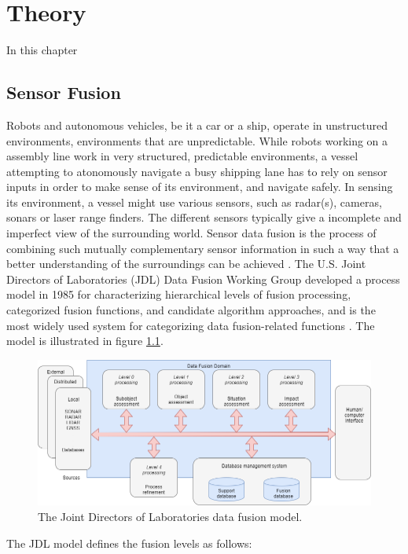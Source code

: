 
\chapter{Theory}
In this chapter 
\section{Sensor Fusion}
\label{section:fusion}
Robots and autonomous vehicles, be it a car or a ship, operate in unstructured environments, environments that are unpredictable. While robots working on a assembly line work in very structured, predictable environments, a vessel attempting to atonomously navigate a busy shipping lane has to rely on sensor inputs in order to make sense of its environment, and navigate safely. In sensing its environment, a vessel might use various sensors, such as radar(s), cameras, sonars or laser range finders. The different sensors typically give a incomplete and imperfect view of the surrounding world. Sensor data fusion is the process of combining such mutually complementary sensor information in such a way that a better understanding of the surroundings can be achieved \cite{sensorFusion1}.
The U.S. Joint Directors of Laboratories (JDL) Data Fusion Working Group developed a process model in 1985 for characterizing hierarchical levels of fusion processing, categorized fusion functions, and candidate algorithm approaches, and is the most widely used system for categorizing data fusion-related functions \cite{JDLFusion}. The model is illustrated in figure \ref{fig:jdl_fusion}.
\begin{figure}[H]
    \centering
    \includegraphics[width=.8\linewidth]{fig/JDLfusion.png}
    \caption{The Joint Directors of Laboratories data fusion model.}
    \label{fig:jdl_fusion}
\end{figure}
The JDL model defines the fusion levels as follows:
